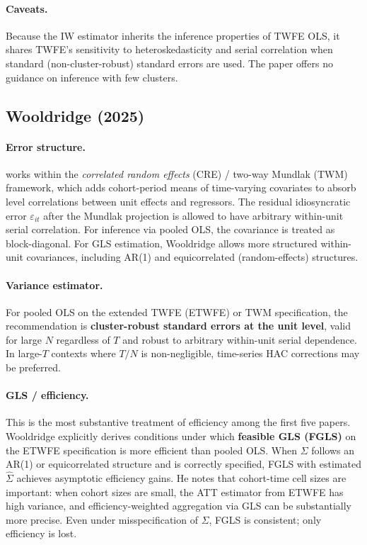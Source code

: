 \documentclass[12pt]{article}
\begin{document}
\paragraph{Caveats.}
Because the IW estimator inherits the inference properties of TWFE OLS,
it shares TWFE's sensitivity to heteroskedasticity and serial correlation
when standard (non-cluster-robust) standard errors are used.
The paper offers no guidance on inference with few clusters.

\subsection{Wooldridge (2025)}

\paragraph{Error structure.}
\citet{wooldridge2025twoway} works within the \textit{correlated random effects}
(CRE) / two-way Mundlak (TWM) framework, which adds cohort-period means of
time-varying covariates to absorb level correlations between unit effects and
regressors.
The residual idiosyncratic error $\varepsilon_{it}$ after the Mundlak projection
is allowed to have arbitrary within-unit serial correlation.
For inference via pooled OLS, the covariance is treated as block-diagonal.
For GLS estimation, Wooldridge allows more structured within-unit covariances,
including AR(1) and equicorrelated (random-effects) structures.

\paragraph{Variance estimator.}
For pooled OLS on the extended TWFE (ETWFE) or TWM specification, the
recommendation is \textbf{cluster-robust standard errors at the unit level},
valid for large $N$ regardless of $T$ and robust to arbitrary within-unit serial
dependence.
In large-$T$ contexts where $T / N$ is non-negligible, time-series HAC
corrections may be preferred.

\paragraph{GLS / efficiency.}
This is the most substantive treatment of efficiency among the first five papers.
Wooldridge explicitly derives conditions under which \textbf{feasible GLS (FGLS)}
on the ETWFE specification is more efficient than pooled OLS.
When $\Sigma$ follows an AR(1) or equicorrelated structure and is correctly
specified, FGLS with estimated $\hat{\Sigma}$ achieves asymptotic efficiency gains.
He notes that cohort-time cell sizes are important: when cohort sizes are small,
the ATT estimator from ETWFE has high variance, and efficiency-weighted
aggregation via GLS can be substantially more precise.
Even under misspecification of $\Sigma$, FGLS is consistent; only efficiency
is lost.
\end{document}
